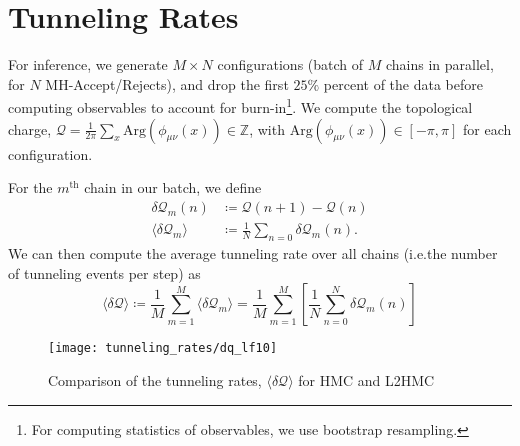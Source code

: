 %
\section{Tunneling Rates}%
\label{sec:tunneling_rates}
%
For inference, we generate \(M\times N\) configurations (batch of \(M\) chains in
parallel, for \(N\) MH-Accept/Rejects), and drop the first \(25\%\)
percent of the data before computing observables to account for
burn-in\footnote{For computing statistics of observables, we use bootstrap
resampling.}.
%
We compute the topological charge, \(\mathcal{Q} =
\frac{1}{2\pi}\sum_{x}\mathrm{Arg}\left(\phi_{\mu\nu}(x)\right) \in
\mathbb{Z}\), with \( \mathrm{Arg}\left(\phi_{\mu\nu}(x)\right) \in \left[-\pi,
\pi\right]\) for each configuration.
%

For the \(m^{\mathrm{th}}\) chain in our batch, we define 
%
\begin{align}
  \delta\mathcal{Q}_{m}(n) &\coloneqq \mathcal{Q}{(n+1)} - \mathcal{Q}{(n)}\\
  \langle\delta\mathcal{Q}_{m}\rangle &\coloneqq
  \frac{1}{N}\sum_{n=0}\delta\mathcal{Q}_{m}(n).
\end{align}
%
We can then compute the average tunneling rate over all chains (i.e.\@ the
number of tunneling events per step) as
%
\begin{equation}
  \langle \delta\mathcal{Q}\rangle%
  \coloneqq \frac{1}{M}\sum_{m=1}^{M}\langle\delta\mathcal{Q}_{m}\rangle
  =\frac{1}{M}\sum_{m=1}^{M}\left[\frac{1}{N}\sum_{n=0}^{N} \delta\mathcal{Q}_{m}(n)\right]
\end{equation}
%

\begin{figure}[htpb]
  \centering
  \texttt{[image: tunneling\_rates/dq\_lf10]}
  \caption{Comparison of the tunneling rates,
  \(\langle\delta\mathcal{Q}\rangle\) for HMC and L2HMC}
\end{figure}

